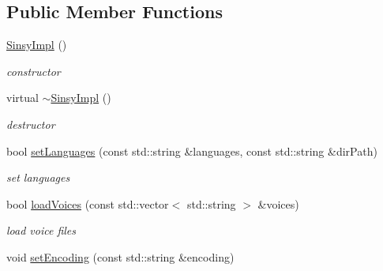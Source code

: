 \subsection*{\-Public \-Member \-Functions}
\begin{DoxyCompactItemize}
\item 
\hypertarget{classsinsy_1_1SinsyImpl_a0d7a0552a3b60f4acc1e70bf87ae0efa}{\hyperlink{classsinsy_1_1SinsyImpl_a0d7a0552a3b60f4acc1e70bf87ae0efa}{\-Sinsy\-Impl} ()}\label{classsinsy_1_1SinsyImpl_a0d7a0552a3b60f4acc1e70bf87ae0efa}

\begin{DoxyCompactList}\small\item\em constructor \end{DoxyCompactList}\item 
\hypertarget{classsinsy_1_1SinsyImpl_acc760f5741befb97c06bd9347c6ec2b8}{virtual \hyperlink{classsinsy_1_1SinsyImpl_acc760f5741befb97c06bd9347c6ec2b8}{$\sim$\-Sinsy\-Impl} ()}\label{classsinsy_1_1SinsyImpl_acc760f5741befb97c06bd9347c6ec2b8}

\begin{DoxyCompactList}\small\item\em destructor \end{DoxyCompactList}\item 
\hypertarget{classsinsy_1_1SinsyImpl_a2d10481fda8da2cdb0374620371d535e}{bool \hyperlink{classsinsy_1_1SinsyImpl_a2d10481fda8da2cdb0374620371d535e}{set\-Languages} (const std\-::string \&languages, const std\-::string \&dir\-Path)}\label{classsinsy_1_1SinsyImpl_a2d10481fda8da2cdb0374620371d535e}

\begin{DoxyCompactList}\small\item\em set languages \end{DoxyCompactList}\item 
\hypertarget{classsinsy_1_1SinsyImpl_ac6db392238ea47e3e37a282a1c0ded5b}{bool \hyperlink{classsinsy_1_1SinsyImpl_ac6db392238ea47e3e37a282a1c0ded5b}{load\-Voices} (const std\-::vector$<$ std\-::string $>$ \&voices)}\label{classsinsy_1_1SinsyImpl_ac6db392238ea47e3e37a282a1c0ded5b}

\begin{DoxyCompactList}\small\item\em load voice files \end{DoxyCompactList}\item 
\hypertarget{classsinsy_1_1SinsyImpl_a702da6b5e69fb27ba595f46c945314f6}{void \hyperlink{classsinsy_1_1SinsyImpl_a702da6b5e69fb27ba595f46c945314f6}{set\-Encoding} (const std\-::string \&encoding)}\label{classsinsy_1_1SinsyImpl_a702da6b5e69fb27ba595f46c945314f6}


\end{DoxyCompactItemize}
